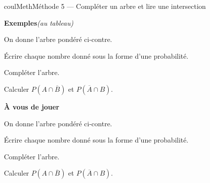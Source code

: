 \documentclass[11pt,a4paper]{article}
\makeatletter
\newcounter{lycee@signet}
\newcommand{\signet}[3][]{\stepcounter{lycee@signet}%
  \edef\lycee@dest{\if\relax\detokenize{#1}\relax
    signet.\arabic{lycee@signet}\else#1\fi}%
  \hypertarget{\lycee@dest}{}\bookmark[level=#2,dest=\lycee@dest]{#3}}
\newcounter{methode}
\newenvironment{methodebox}[1][Méthode]{\stepcounter{methode}%
  \begin{boitecours}[phantom={\signet[methode-\arabic{methode}]{2}{#1}}]{coulMeth}{#1}}%
  {\end{boitecours}}
\newcommand{\etape}[1]{\par\smallskip\textbf{\color{coulMeth}#1}\par\nobreak\smallskip}
\newcommand{\autableau}{\hfill{\footnotesize\itshape\color{black!45}(au tableau)}}
\newcommand{\etapeexemples}{%
    \par\smallskip\textbf{\color{coulMeth}Exemples}\autableau\par\nobreak\smallskip}
\makeatother
\begin{document}
\begin{methodebox}[Méthode 5 --- Compléter un arbre et lire une intersection]
\etapeexemples
\begin{minipage}[c]{0.44\linewidth}\raggedright
On donne l'arbre pondéré ci-contre.
\begin{questions}[label=\alph*)]
  \item Écrire chaque nombre donné sous la forme d'une probabilité.
  \item Compléter l'arbre.
  \item Calculer $P(A\cap\overline{B})$ et $P(\overline{A}\cap B)$.
\end{questions}
\end{minipage}\hfill
\begin{minipage}[c]{0.54\linewidth}\centering
{}
\end{minipage}

\etape{À vous de jouer}
\begin{minipage}[c]{0.44\linewidth}\raggedright
On donne l'arbre pondéré ci-contre.
\begin{questions}[label=\alph*)]
  \item Écrire chaque nombre donné sous la forme d'une probabilité.
  \item Compléter l'arbre.
  \item Calculer $P(A\cap\overline{B})$ et $P(\overline{A}\cap B)$.
\end{questions}
\end{minipage}\hfill
\begin{minipage}[c]{0.54\linewidth}\centering
{}
\end{minipage}

\end{methodebox}
\end{document}
